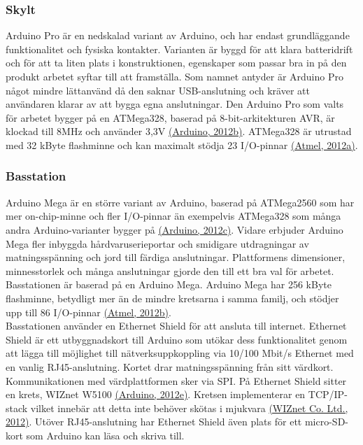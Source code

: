 \documentclass[a4paper,11pt]{article}
\begin{document}
\subsubsection{Skylt}
Arduino Pro är en nedskalad variant av Arduino, och har endast grundläggande funktionalitet och fysiska kontakter. Varianten är byggd för att klara batteridrift och för att ta liten plats i konstruktionen, egenskaper som passar bra in på den produkt arbetet syftar till att framställa. Som namnet antyder är Arduino Pro något mindre lättanvänd då den saknar USB-anslutning och kräver att användaren klarar av att bygga egna anslutningar. Den Arduino Pro som valts för arbetet bygger på en ATMega328, baserad på 8-bit-arkitekturen AVR, är klockad till 8MHz och använder 3,3V \hyperref[arduino]{(Arduino, 2012b)}. ATMega328 är utrustad med 32 kByte flashminne och kan maximalt stödja 23 I/O-pinnar \hyperref[atmel]{(Atmel, 2012a)}.

\subsubsection{Basstation}
Arduino Mega är en större variant av Arduino, baserad på ATMega2560 som har mer on-chip-minne och fler I/O-pinnar än exempelvis ATMega328 som många andra Arduino-varianter bygger på \hyperref[arduino]{(Arduino, 2012c)}. Vidare erbjuder Arduino Mega fler inbyggda hårdvaruserieportar och smidigare utdragningar av matningsspänning och jord till färdiga anslutningar. Plattformens dimensioner, minnesstorlek och många anslutningar gjorde den till ett bra val för arbetet. Basstationen är baserad på en Arduino Mega. Arduino Mega har 256 kByte flashminne, betydligt mer än de mindre kretsarna i samma familj, och stödjer upp till 86 I/O-pinnar \hyperref[atmel]{(Atmel, 2012b)}. \\

Basstationen använder en Ethernet Shield för att ansluta till internet. Ethernet Shield är ett utbyggnadskort till Arduino som utökar dess funktionalitet genom att lägga till möjlighet till nätverksuppkoppling via 10/100 Mbit/s Ethernet med en vanlig RJ45-anslutning. Kortet drar matningsspänning från sitt värdkort. Kommunikationen med värdplattformen sker via SPI. På Ethernet Shield sitter en krets, WIZnet W5100 \hyperref[arduino]{(Arduino, 2012e)}. Kretsen implementerar en TCP/IP-stack vilket innebär att detta inte behöver skötas i mjukvara \hyperref[wiznet]{(WIZnet Co. Ltd., 2012)}. Utöver RJ45-anslutning har Ethernet Shield även plats för ett micro-SD-kort som Arduino kan läsa och skriva till. \\
\end{document}
